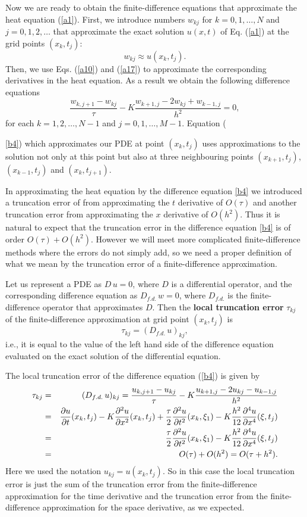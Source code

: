  
Now we are ready to obtain the finite-difference equations that approximate
the heat equation (\ref{a1}). First, we introduce numbers $w_{kj}$ for $k=0,1,\dots,N$ and
$j=0,1,2,\dots$ that approximate the exact solution $u(x,t)$ of Eq. (\ref{a1}) at the grid points
$(x_{k}, t_{j})$:
\[
w_{kj}\approx u(x_{k},t_{j}).
\]
Then, we use Eqs. (\ref{a10}) and (\ref{a17}) to approximate
the corresponding derivatives in the heat equation. As a result we obtain the following
difference equations
\begin{equation}
\frac{w_{k,j+1}-w_{kj}}{\tau}-K
\frac{w_{k+1, j}-2w_{kj}+w_{k-1,j}}{h^{2}}=0, \label{b4}
\end{equation}
for each $k=1, 2, \dots, N-1$ and $j=0, 1, \dots, M-1$. Equation ({\ref{b4})
which approximates our PDE at point $(x_{k},t_{j})$ uses approximations to the solution
not only at this point but also
at three neighbouring points $(x_{k+1},t_{j})$, $(x_{k-1},t_{j})$ and $(x_{k},t_{j+1})$.

In approximating the heat equation by the difference equation \eqref{b4} we
introduced a truncation error of from approximating the $t$ derivative of $O(\tau)$
and another truncation error from approximating the $x$ derivative of $O(h^2)$.
Thus it is natural to expect that the truncation error in the difference
equation \eqref{b4} is of order $O(\tau)+O(h^2)$. However we will meet more 
complicated finite-difference methods where the errors do not simply add, so
we need a proper definition of what we mean by the truncation error of a 
finite-difference approximation.

\begin{definition}
Let us represent a PDE as $D\,u=0$, where $D$ is a differential operator,
and the corresponding difference equation as $D_{f.d.}\,w=0$, where
$D_{f.d.}$ is the finite-difference operator that approximates $D$. Then
the {\bf local truncation error} $\tau_{kj}$ of the finite-difference 
approximation at grid point $(x_k,t_j)$ is 
\[\tau_{kj}=(D_{f.d.}\,u)_{kj},\]
i.e., it is equal to the value of the left hand side of the difference
equation evaluated on the exact solution of the differential equation.
\end{definition}
The local truncation error of
the difference equation (\ref{b4}) is given by
\begin{eqnarray*}
\tau_{kj} &=& (D_{f.d.}\,u)_{kj} =
\frac{u_{k,j+1}-u_{kj}}{\tau}-K
\frac{u_{k+1, j}-2u_{kj}-u_{k-1,j}}{h^{2}} \\
&=& \frac{{\partial} u}{{\partial} t}(x_{k},t_{j})-
K\frac{{\partial}^2 u}{{\partial} x^2}(x_{k},t_{j})+
\frac{\tau}{2}\frac{{\partial}^{2} u}{{\partial} t^{2}}(x_{k},
\xi_{1})- K\frac{h^{2}}{12}\frac{{\partial}^{4} u}{{\partial} x^{4}}(\xi,t_{j})\\
&=&\frac{\tau}{2}\frac{{\partial}^{2} u}{{\partial} t^{2}}(x_{k},
\xi_{1})- K\frac{h^{2}}{12}\frac{{\partial}^{4} u}{{\partial} x^{4}}(\xi,t_{j})\\
&=&O(\tau)+O(h^{2})=O(\tau+h^{2}). 
\end{eqnarray*}
Here we used the notation $u_{kj}=u(x_{k}, t_{j})$. 
So in this case the local truncation error is just the sum of the truncation error
from the finite-difference approximation for the time derivative and
the truncation error from the finite-difference approximation for the space
derivative, as we expected.

}
